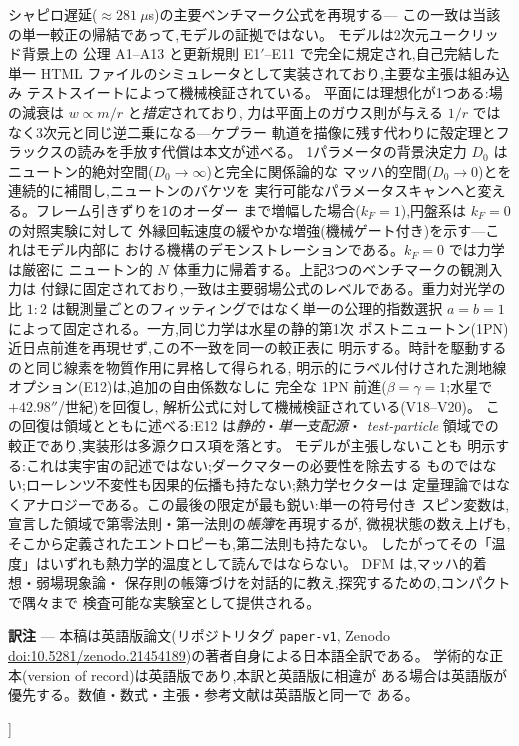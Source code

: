 \documentclass[a4paper,10pt,twocolumn]{ltjsarticle}
\newcommand{\Dz}{D_0}
\begin{document}
{\begin{center}
\begin{minipage}{0.95\textwidth}
シャピロ遅延($\approx 281\ \mu$s)の主要ベンチマーク公式を再現する---
この一致は当該の単一較正の帰結であって,モデルの証拠ではない。
モデルは2次元ユークリッド背景上の
公理 A1--A13 と更新規則 E1$'$--E11 で完全に規定され,自己完結した単一
HTML ファイルのシミュレータとして実装されており,主要な主張は組み込み
テストスイートによって機械検証されている。
平面には理想化が1つある:場の減衰は $w \propto m/r$ と\emph{措定}されており,
力は平面上のガウス則が与える $1/r$ ではなく3次元と同じ逆二乗になる---ケプラー
軌道を描像に残す代わりに殻定理とフラックスの読みを手放す代償は本文が述べる。
1パラメータの背景決定力
$\Dz$ はニュートン的絶対空間($\Dz \to \infty$)と完全に関係論的な
マッハ的空間($\Dz \to 0$)とを連続的に補間し,ニュートンのバケツを
実行可能なパラメータスキャンへと変える。フレーム引きずりを1のオーダー
まで増幅した場合($k_F = 1$),円盤系は $k_F = 0$ の対照実験に対して
外縁回転速度の緩やかな増強(機械ゲート付き)を示す---これはモデル内部に
おける機構のデモンストレーションである。$k_F = 0$ では力学は厳密に
ニュートン的 $N$ 体重力に帰着する。上記3つのベンチマークの観測入力は
付録に固定されており,一致は主要弱場公式のレベルである。重力対光学の比
$1{:}2$ は観測量ごとのフィッティングではなく単一の公理的指数選択
$a = b = 1$ によって固定される。一方,同じ力学は水星の静的第1次
ポストニュートン(1PN)近日点前進を再現せず,この不一致を同一の較正表に
明示する。時計を駆動するのと同じ線素を物質作用に昇格して得られる,
明示的にラベル付けされた測地線オプション(E12)は,追加の自由係数なしに
完全な 1PN 前進($\beta = \gamma = 1$;水星で $+42.98''$/世紀)を回復し,
解析公式に対して機械検証されている(V18--V20)。
この回復は領域とともに述べる:E12 は\emph{静的}・\emph{単一支配源}・
\emph{test-particle} 領域での較正であり,実装形は多源クロス項を落とす。
モデルが主張しないことも
明示する:これは実宇宙の記述ではない;ダークマターの必要性を除去する
ものではない;ローレンツ不変性も因果的伝播も持たない;熱力学セクターは
定量理論ではなくアナロジーである。この最後の限定が最も鋭い:単一の符号付き
スピン変数は,宣言した領域で第零法則・第一法則の\emph{帳簿}を再現するが,
微視状態の数え上げも,そこから定義されたエントロピーも,第二法則も持たない。
したがってその「温度」はいずれも熱力学的温度として読んではならない。
DFM は,マッハ的着想・弱場現象論・
保存則の帳簿づけを対話的に教え,探究するための,コンパクトで隅々まで
検査可能な実験室として提供される。
\vspace{4pt}

\textbf{訳注} --- 本稿は英語版論文(リポジトリタグ \texttt{paper-v1},
Zenodo \href{https://doi.org/10.5281/zenodo.21454189}%
{doi:10.5281/zenodo.21454189})の著者自身による日本語全訳である。
学術的な正本(version of record)は英語版であり,本訳と英語版に相違が
ある場合は英語版が優先する。数値・数式・主張・参考文献は英語版と同一で
ある。
\end{minipage}
\end{center}
\vspace{14pt}
}]
\end{document}
